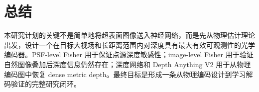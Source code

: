 \documentclass[11pt,a4paper,fontset=none]{ctexart}
\begin{document}
\section{总结}

本研究计划的关键不是简单地将超表面图像送入神经网络，而是先从物理估计理论出发，设计一个在目标大视场和长距离范围内对深度具有最大有效可观测性的光学编码器。PSF-level Fisher 用于保证点源深度敏感性；image-level Fisher 用于验证自然图像叠加后深度信息仍然存在；深度网络和 Depth Anything V2 用于从物理编码图中恢复 dense metric depth。最终目标是形成一条从物理编码设计到学习解码验证的完整研究闭环。
\end{document}
